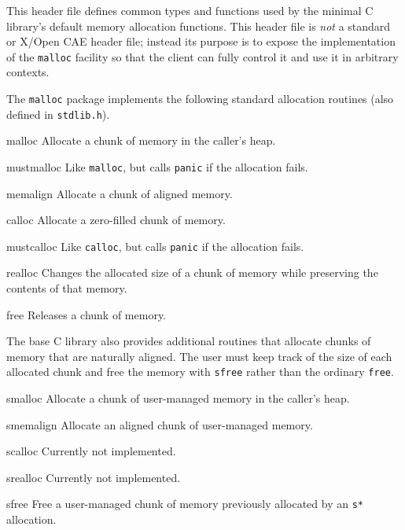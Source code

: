 \label{malloc-h}
\begin{apidesc}
	This header file defines common types and functions used by
	the minimal C library's default memory allocation functions.
	This header file is \emph{not} a standard \posix{} or X/Open CAE
	header file; instead its purpose is to expose the implementation
	of the \texttt{malloc} facility so that the client can fully control
	it and use it in arbitrary contexts.

	The \texttt{malloc} package implements the following standard
	allocation routines (also defined in \texttt{stdlib.h}).

	\begin{csymlist}
		\item[malloc]
			Allocate a chunk of memory in the caller's heap.
		\item[mustmalloc]
			Like {\tt malloc},
			but calls {\tt panic} if the allocation fails.
		\item[memalign]
			Allocate a chunk of aligned memory.
		\item[calloc]
			Allocate a zero-filled chunk of memory.
		\item[mustcalloc]
			Like {\tt calloc},
			but calls {\tt panic} if the allocation fails.
		\item[realloc]
			Changes the allocated size of a chunk of memory while
			preserving the contents of that memory.
		\item[free]
			Releases a chunk of memory.
	\end{csymlist}

	The base C library also provides additional routines
	that allocate chunks of memory that are naturally aligned.
	The user must keep track of the size of each allocated chunk
	and free the memory with \texttt{sfree} rather than the ordinary
	\texttt{free}.

	\begin{csymlist}
		\item[smalloc]
			Allocate a chunk of user-managed memory in the
			caller's heap.
		\item[smemalign]
			Allocate an aligned chunk of user-managed memory.
		\item[scalloc]
			Currently not implemented.
		\item[srealloc]
			Currently not implemented.
		\item[sfree]
			Free a user-managed chunk of memory previously
			allocated by an \texttt{s*} allocation.
	\end{csymlist}


\end{apidesc}
